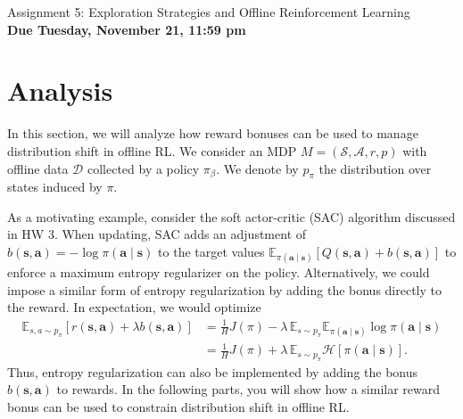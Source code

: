 \documentclass{article}
\def\D{\mathcal{D}}
\def\S{\mathcal{S}}
\def\A{\mathcal{A}}
\def\s{\mathbf{s}}
\def\a{\mathbf{a}}
\def\E{\mathbb{E}}
\def\pib{\pi_{\beta}}
\begin{document}

\begin{centering}
    {\Large Assignment 5: Exploration Strategies and Offline Reinforcement Learning} \\
    \vspace{.25cm}
    \textbf{Due Tuesday, November 21, 11:59 pm} \\
\end{centering}
\newcommand*{\MYSOLUTION}[0]{\textbf{\textcolor{red}{My Solution: }}}
\section{Analysis}
\label{sec:analysis}
\def\H{\mathcal{H}}

In this section, we will analyze how reward bonuses can be used to manage distribution shift in offline RL. We consider an MDP $M=(\S,\A,r,p)$ with offline data $\D$ collected by a policy $\pib$. We denote by $p_\pi$ the distribution over states induced by $\pi$.


As a motivating example, consider the soft actor-critic (SAC) algorithm discussed in HW 3. When updating, SAC adds an adjustment of $b(\s,\a)=-\log \pi(\a\mid\s)$ to the target values $\E_{\pi(\a\mid\s)}[Q(\s,\a)+b(\s,\a)]$ to enforce a maximum entropy regularizer on the policy. Alternatively, we could impose a similar form of entropy regularization by adding the bonus directly to the reward. In expectation, we would optimize \begin{align*}
  \E_{s,a\sim p_\pi} [r(\s,\a)+\lambda b(\s,\a)] 
  &= \tfrac1H J(\pi)-\lambda\,\E_{s\sim p_\pi}\E_{\pi(\a\mid\s)}\log \pi(\a\mid\s) \\
  &= \tfrac1H J(\pi)+\lambda\,\E_{s\sim p_\pi}\H[\pi(\a\mid\s)].
\end{align*}
Thus, entropy regularization can also be implemented by adding the bonus $b(\s,\a)$ to rewards. In the following parts, you will show how a similar reward bonus can be used to constrain distribution shift in offline RL.
\end{document}
